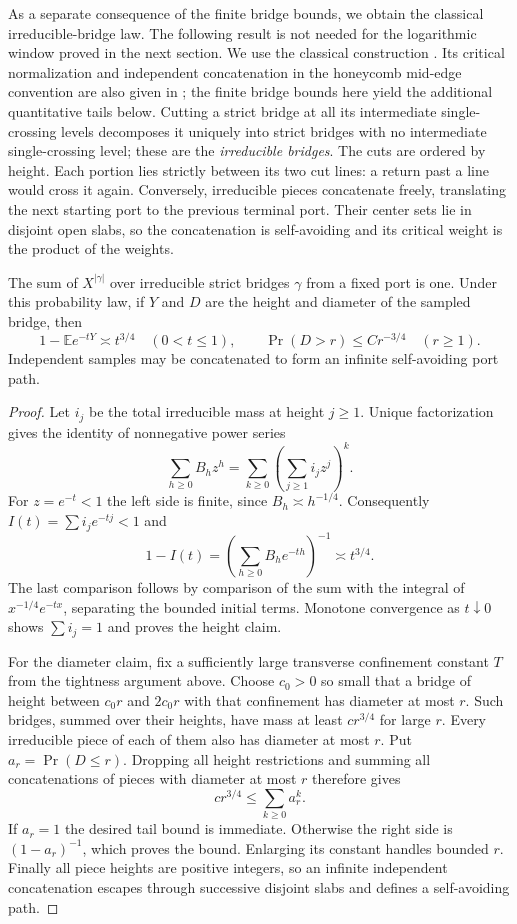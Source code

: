 As a separate consequence of the finite bridge bounds, we obtain the
classical irreducible-bridge law. The following result is not needed for
the logarithmic window proved in the next section. We use the classical
construction \cite{Kesten1963,MadrasSlade1993}. Its critical normalization
and independent concatenation in the honeycomb mid-edge convention are
also given in \cite[Appendix]{BeatonEtAl2014}; the finite bridge bounds
here yield the additional quantitative tails below.
Cutting a strict bridge at all its intermediate single-crossing levels
decomposes it uniquely into strict bridges with no intermediate
single-crossing level; these are the \emph{irreducible bridges}. The cuts are ordered by height.
Each portion lies strictly between its two cut lines: a return past a
line would cross it again. Conversely, irreducible pieces concatenate
freely, translating the next starting port to the previous terminal
port. Their center sets lie in disjoint open slabs, so the concatenation
is self-avoiding and its critical weight is the product of the weights.

\begin{proposition}\label{L:prop:irreducible}
The sum of $X^{|\gamma|}$ over irreducible strict bridges $\gamma$ from a
fixed port is one. Under this probability law, if $Y$ and $D$ are the
height and diameter of the sampled bridge, then
\[
 1-\mathbb E e^{-tY}\asymp t^{3/4}\quad(0<t\le1),\qquad
 \Pr(D>r)\le C r^{-3/4}\quad(r\ge1).
\]
Independent samples may be concatenated to form an infinite
self-avoiding port path.
\end{proposition}
\begin{proof}
Let $i_j$ be the total irreducible mass at height $j\ge1$. Unique
factorization gives the identity of nonnegative power series
\[
 \sum_{h\ge0}B_hz^h=\sum_{k\ge0}\left(\sum_{j\ge1}i_jz^j\right)^k.
\]
For $z=e^{-t}<1$ the left side is finite, since $B_h\asymp h^{-1/4}$.
Consequently $I(t)=\sum i_j e^{-tj}<1$ and
\[
 1-I(t)=\left(\sum_{h\ge0}B_he^{-th}\right)^{-1}\asymp t^{3/4}.
\]
The last comparison follows by comparison of the sum with the integral
of $x^{-1/4}e^{-tx}$, separating the bounded initial terms. Monotone
convergence as $t\downarrow0$ shows $\sum i_j=1$ and proves the height
claim.

For the diameter claim, fix a sufficiently large transverse confinement
constant $T$ from the tightness argument above. Choose $c_0>0$ so small
that a bridge of height between $c_0r$ and $2c_0r$ with that confinement
has diameter at most $r$. Such bridges, summed over their heights, have
mass at least $c r^{3/4}$ for large $r$. Every irreducible piece of each
of them also has diameter at most $r$. Put $a_r=\Pr(D\le r)$. Dropping
all height restrictions and summing all concatenations of pieces with
diameter at most $r$ therefore gives
\[
 c r^{3/4}\le\sum_{k\ge0}a_r^k.
\]
If $a_r=1$ the desired tail bound is immediate. Otherwise the right side
is $(1-a_r)^{-1}$, which proves the bound. Enlarging its constant handles
bounded $r$. Finally all piece heights are positive integers, so an
infinite independent concatenation escapes through successive disjoint
slabs and defines a self-avoiding path.
\end{proof}

